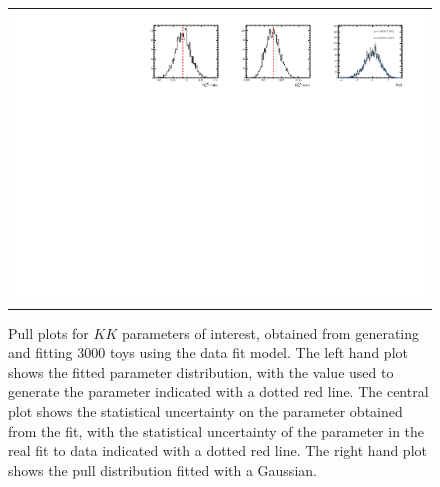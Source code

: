 \begin{figure}
\begin{tabular}{c}
\includegraphics[width=\textwidth]{ANA_resources/Plots/Data_fit/FitterBias//CombinedRuns//R_ds_KK.pdf} \\
  \end{tabular}
  \caption{Pull plots for $KK$ parameters of interest, obtained from generating and fitting 3000 toys using the data fit model. The left hand plot shows the fitted parameter distribution, with the value used to generate the parameter indicated with a dotted red line. The central plot shows the statistical uncertainty on the parameter obtained from the fit, with the statistical uncertainty of the parameter in the real fit to data indicated with a dotted red line. The right hand plot shows the pull distribution fitted with a Gaussian.}
\label{fig:KK/CombinedRuns/_pulls}
\end{figure}
